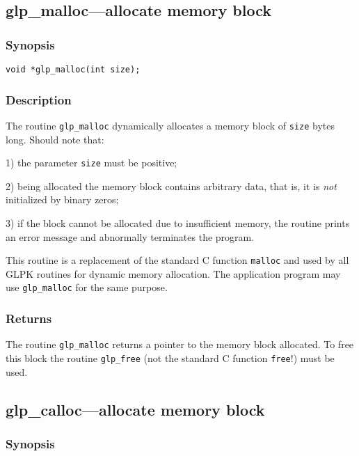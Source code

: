 \subsection{glp\_malloc---allocate memory block}

\subsubsection*{Synopsis}

\begin{verbatim}
void *glp_malloc(int size);
\end{verbatim}

\subsubsection*{Description}

The routine \verb|glp_malloc| dynamically allocates a memory block of
\verb|size| bytes long. Should note that:

1) the parameter \verb|size| must be positive;

2) being allocated the memory block contains arbitrary data, that is,
it is {\it not} initialized by binary zeros;

3) if the block cannot be allocated due to insufficient memory, the
routine prints an error message and abnormally terminates the program.

This routine is a replacement of the standard C function \verb|malloc|
and used by all GLPK routines for dynamic memory allocation. The
application program may use \verb|glp_malloc| for the same purpose.

\subsubsection*{Returns}

The routine \verb|glp_malloc| returns a pointer to the memory block
allocated. To free this block the routine \verb|glp_free| (not the
standard C function \verb|free|!) must be used.

\newpage

\subsection{glp\_calloc---allocate memory block}

\subsubsection*{Synopsis}

